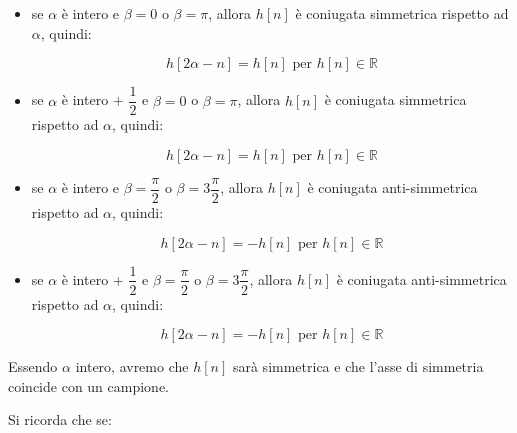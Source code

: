 \begin{itemize}
    \item se $\alpha$ è intero e $\beta = 0$ o $\beta = \pi$, allora $h \left[ n\right]$ è coniugata simmetrica rispetto ad $\alpha$, quindi: 
    
    {
        \Large 
        \begin{equation}
            h \left[ 2 \alpha - n\right] = h \left[ n\right] \text{ per } h \left[ n\right] \in \mathbb{R}
        \end{equation}
    }

    \item se $\alpha$ è intero + $\dfrac{1}{2}$ e $\beta = 0$ o $\beta = \pi$, allora $h \left[ n\right]$ è coniugata simmetrica rispetto ad $\alpha$, quindi: 
    
    {
        \Large 
        \begin{equation}
            h \left[ 2 \alpha - n\right] = h \left[ n\right] \text{ per } h \left[ n\right] \in \mathbb{R}
        \end{equation}
    }

    \item se $\alpha$ è intero e $\beta = \dfrac{\pi}{2}$ o $\beta = 3 \dfrac{\pi}{2}$, allora $h \left[ n\right]$ è coniugata anti-simmetrica rispetto ad $\alpha$, quindi: 
    
    {
        \Large 
        \begin{equation}
            h \left[ 2 \alpha - n\right] = - h \left[ n\right] \text{ per } h \left[ n\right] \in \mathbb{R}
        \end{equation}
    }

    \item se $\alpha$ è intero + $\dfrac{1}{2}$ e $\beta = \dfrac{\pi}{2}$ o $\beta = 3 \dfrac{\pi}{2}$, allora $h \left[ n\right]$ è coniugata anti-simmetrica rispetto ad $\alpha$, quindi: 
    
    {
        \Large 
        \begin{equation}
            h \left[ 2 \alpha - n\right] = - h \left[ n\right] \text{ per } h \left[ n\right] \in \mathbb{R}
        \end{equation}
    }
\end{itemize}

Essendo $\alpha$ intero, avremo che $h \left[ n\right]$ sarà simmetrica e che l'asse di simmetria coincide con un campione. \newline 

Si ricorda che se: 

